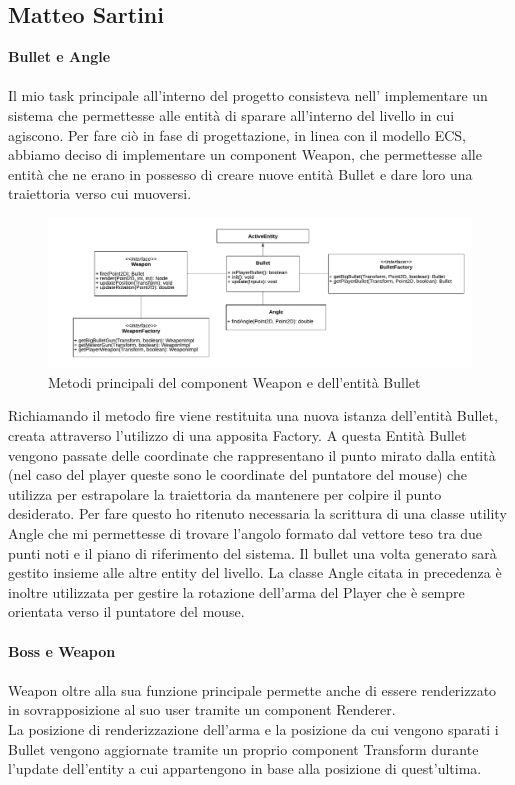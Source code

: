 \documentclass[a4paper,12pt]{report}
\begin{document}
\subsection{Matteo Sartini}
\textbf{Bullet e Angle}\\
\\
Il mio task principale all’interno del progetto consisteva nell’ implementare un sistema che permettesse alle entità di sparare all’interno del livello in cui agiscono.
Per fare ciò in fase di progettazione, in linea con il modello ECS, abbiamo deciso di implementare un component Weapon, che permettesse alle entità che ne erano in possesso di creare nuove entità Bullet e dare loro una traiettoria verso cui muoversi.

\begin{figure}[ht]
\includegraphics[width=1\textwidth]{images/UMLWeapon.png}
\caption{Metodi principali del component Weapon e dell’entità Bullet}
\label{fig:weapon}
\end{figure}

Richiamando il metodo fire viene restituita una nuova istanza dell’entità Bullet, creata attraverso l’utilizzo di una apposita Factory. A questa Entità Bullet vengono passate delle coordinate che rappresentano il punto mirato dalla entità (nel caso del player queste sono le coordinate del puntatore del mouse) che utilizza per estrapolare la traiettoria da mantenere per colpire il punto desiderato. Per fare questo ho ritenuto necessaria la scrittura di una classe utility Angle che mi permettesse di trovare l’angolo formato dal vettore teso tra due punti noti e il piano di riferimento del sistema. Il bullet una volta generato sarà gestito insieme alle altre entity del livello.
La classe Angle citata in precedenza è inoltre utilizzata per gestire la rotazione dell’arma del Player che è sempre orientata verso il puntatore del mouse.\\
\\
\textbf{Boss e Weapon}\\
\\
Weapon oltre alla sua funzione principale permette anche di essere renderizzato in sovrapposizione al suo user tramite un component Renderer.\\ La posizione di renderizzazione dell’arma e la posizione da cui vengono sparati i Bullet vengono aggiornate tramite un proprio component Transform durante l’update dell’entity a cui appartengono in base alla posizione di quest’ultima.
\end{document}
